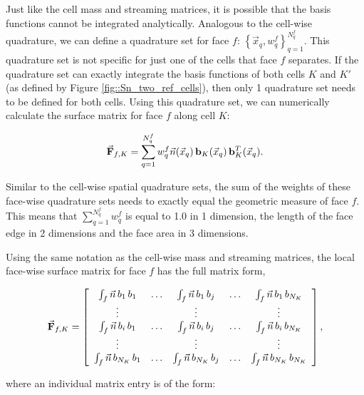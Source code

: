 Just like the cell mass and streaming matrices, it is possible that the basis functions cannot be integrated analytically. Analogous to the cell-wise quadrature, we can define a quadrature set for  face $f$: $\left\{  \vec{x}_q , w_q^{f}  \right\}_{q=1}^{N_q^f}$. This quadrature set is not specific for just one of the cells that face $f$ separates. If the quadrature set can exactly integrate the basis functions of both cells $K$ and $K'$ (as defined by Figure \ref{fig::Sn_two_ref_cells}), then only 1 quadrature set needs to be defined for both cells. Using this quadrature set, we can numerically calculate the surface matrix for face $f$ along cell $K$:

\begin{equation}
\label{eq::Sn_surface_matrix_numerical}
\vec{{\bf F}}_{f,K} =    \sum_{q = 1}^{N_q^f} w_{q}^f \vec{n} (\vec{x}_q) \, {\bf b}_K (\vec{x}_q) \, {\bf b}_K^T (\vec{x}_q) .
\end{equation}

\noindent Similar to the cell-wise spatial quadrature sets, the sum of the weights of these face-wise quadrature sets needs to exactly equal the geometric measure of face $f$. This means that $\sum_{q = 1}^{N_q^f} w_{q}^f$ is equal to 1.0 in 1 dimension, the length of the face edge in 2 dimensions and the face area in 3 dimensions. 

Using the same notation as the cell-wise mass and streaming matrices, the local face-wise surface matrix for face $f$ has the full matrix form,

\begin{equation}
\label{eq::Sn_surface_matrix_array}
\vec{{\bf F}}_{f,K} =   \left[
\begin{array} {ccccc}
	\int_f \vec{n} \, b_1 \, b_1  & \ldots & \int_f \vec{n} \, b_1 \, b_j  & \ldots & \int_f \vec{n} \, b_1 \, b_{N_K} \\
	\vdots  &  & \vdots  &  & \vdots \\
	\int_f \vec{n} \,  b_i \, b_1  & \ldots & \int_f \vec{n} \, b_i \, b_j  & \ldots & \int_f \vec{n} \, b_i \, b_{N_K} \\
	\vdots  &  & \vdots  &  & \vdots \\
	\int_f \vec{n} \,  b_{N_K} \, b_1  & \ldots & \int_f \vec{n} \,  b_{N_K} \, b_j  & \ldots & \int_f \vec{n} \,  b_{N_K} \, b_{N_K} \\
\end{array}
\right] ,
\end{equation}

\noindent where an individual matrix entry is of the form:

